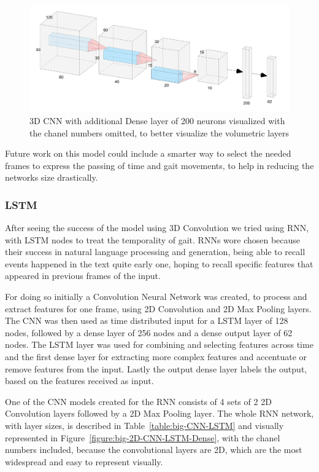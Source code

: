 \documentclass[12pt]{article}
\theoremstyle{definition}
\begin{document}
	\begin{figure}
		\includegraphics[width=\textwidth]{3D-CNN-200-Dense.png}
		\caption{3D CNN with additional Dense layer of 200 neurons visualized with the chanel numbers omitted, to better visualize the volumetric layers}
		\label{figure:3D-CNN-200-Dense}
	\end{figure}

	Future work on this model could include a smarter way to select the needed frames to express the passing of time and gait movements, to help in reducing the networks size drastically.

	\subsubsection{LSTM}

	After seeing the success of the model using 3D Convolution we tried using RNN, with LSTM nodes to treat the temporality of gait. RNNs wore chosen because their success in natural language processing and generation, being able to recall events happened in the text quite early one, hoping to recall specific features that appeared in previous frames of the input.

	For doing so initially a Convolution Neural Network was created, to process and extract features for one frame, using 2D Convolution and 2D Max Pooling layers. The CNN was then used as time distributed input for a LSTM layer of 128 nodes, followed by a dense layer of 256 nodes and a dense output layer of 62 nodes.
	The LSTM layer was used for combining and selecting features across time and the first dense layer for extracting more complex features and accentuate or remove features from the input. Lastly the output dense layer labels the output, based on the features received as input.

	One of the CNN models created for the RNN consists of 4 sets of 2 2D Convolution layers followed by a 2D Max Pooling layer. The whole RNN network, with layer sizes, is described in Table~\ref{table:big-CNN-LSTM} and visually represented in Figure~\ref{figure:big-2D-CNN-LSTM-Dense}, with the chanel numbers included, because the convolutional layers are 2D, which are the most widespread and easy to represent visually.
\end{document}

